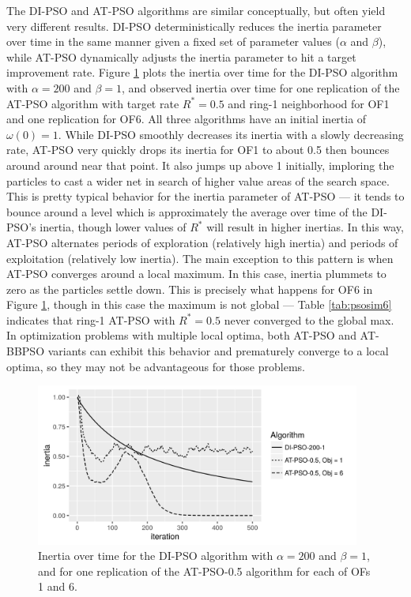 \documentclass[12pt]{article}
\begin{document}
The DI-PSO and AT-PSO algorithms are similar conceptually, but often yield very different results. DI-PSO deterministically reduces the inertia parameter over time in the same manner given a fixed set of parameter values ($\alpha$ and $\beta$), while AT-PSO dynamically adjusts the inertia parameter to hit a target improvement rate. Figure \ref{fig:inertia} plots the inertia over time for the DI-PSO algorithm with $\alpha=200$ and $\beta=1$, and observed inertia over time for one replication of the AT-PSO algorithm with target rate $R^*=0.5$ and ring-1 neighborhood for OF1 and one replication for OF6. All three algorithms have an initial inertia of $\omega(0)=1$. While DI-PSO smoothly decreases its inertia with a slowly decreasing rate, AT-PSO very quickly drops its inertia for OF1 to about 0.5 then bounces around around near that point. It also jumps up above 1 initially, imploring the particles to cast a wider net in search of higher value areas of the search space. This is pretty typical behavior for the inertia parameter of AT-PSO --- it tends to bounce around a level which is approximately the average over time of the DI-PSO's inertia, though lower values of $R^*$ will result in higher inertias. In this way, AT-PSO alternates periods of exploration (relatively high inertia) and periods of exploitation (relatively low inertia). The main exception to this pattern is when AT-PSO converges around a local maximum. In this case, inertia plummets to zero as the particles settle down. This is precisely what happens for OF6 in Figure \ref{fig:inertia}, though in this case the maximum is not global --- Table \ref{tab:psosim6} indicates that ring-1 AT-PSO with $R^*=0.5$ never converged to the global max. In optimization problems with multiple local optima, both AT-PSO and AT-BBPSO variants can exhibit this behavior and prematurely converge to a local optima, so they may not be advantageous for those problems. 

\begin{figure}[!ht]
\centering
\includegraphics[width=0.95\textwidth]{code/psosims/inertiaplot.png}
\caption{Inertia over time for the DI-PSO algorithm with $\alpha=200$ and $\beta=1$, and for one replication of the AT-PSO-0.5 algorithm for each of OFs 1 and 6.}
\label{fig:inertia}
\end{figure}
\end{document}
